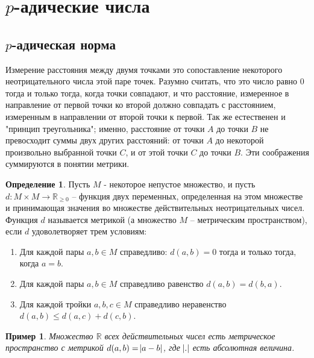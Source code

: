 \documentclass[master, och, diploma, times]{sty/SCWorks}
\theoremstyle{plain}
\newtheorem{exmp}{Пример}[section]
\theoremstyle{definition}
\newtheorem{defn}{Определение}[section]
\numberwithin{equation}{section}
\begin{document}
\section{$p$-адические числа}

\subsection{$p$-адическая норма}

Измерение расстояния между двумя точками это сопоставление некоторого неотрицательного числа этой паре точек. Разумно считать, что это число равно $0$ тогда и только тогда, когда точки совпадают, и что расстояние, измеренное в направление от первой точки ко второй должно совпадать с расстоянием, измеренным в направлении от второй точки к первой. Так же естественен и "принцип треугольника"; именно, расстояние от точки $A$ до точки $B$ не превосходит суммы двух других расстояний: от точки $A$ до некоторой произвольно выбранной точки $C$, и от этой точки $C$ до точки $B$. Эти соображения суммируются в понятии метрики.

\begin{defn}
Пусть $M$ - некоторое непустое множество, и пусть \linebreak ${d: M \times M \rightarrow \mathbb {R}_{\ge0}}$ -- функция двух переменных, определенная на этом множестве и принимающая значения во множестве действительных неотрицательных чисел. Функция $d$ называется метрикой (а множество $M$ -- метрическим пространством), если $d$ удоволетворяет трем условиям:

\begin{enumerate} 
	\item Для каждой пары $a, b \in M$ справедливо: $d(a, b)=0$ тогда и только тогда, когда $a=b$.
	\item Для каждой пары $a, b \in M$ справедливо равенство $d(a, b) = d(b, a)$.
	\item Для каждой тройки $a, b, c \in M$ справедливо неравенство $d(a, b) \le d(a, c) + d(c, b)$.
\end{enumerate}
\end{defn}

\begin{exmp}
Множество $\mathbb {R}$ всех действительных чисел есть метрическое пространство с метрикой $d(a, b)= \abs{a-b}$, где $\abs{.}$ есть абсолютная величина.
\end{exmp}
\end{document}
